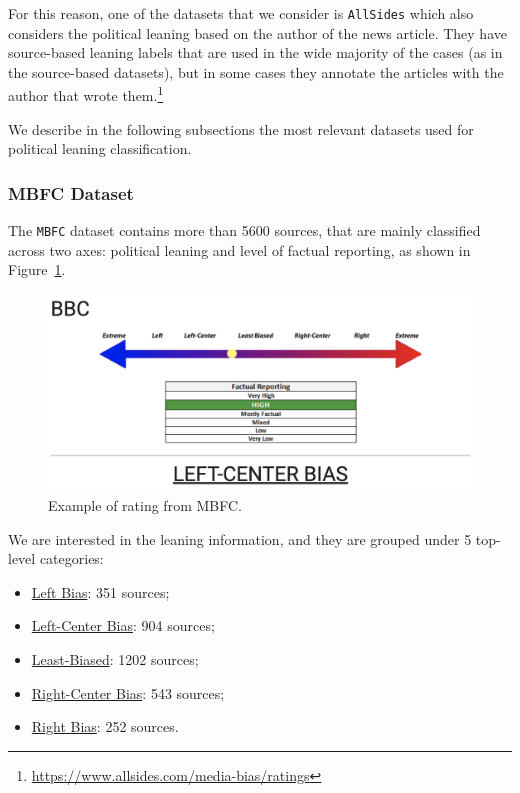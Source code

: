 For this reason, one of the datasets that we consider is \texttt{AllSides} which also considers the political leaning based on the author of the news article. They have source-based leaning labels that are used in the wide majority of the cases (as in the source-based datasets), but in some cases they annotate the articles with the author that wrote them.\footnote{\url{https://www.allsides.com/media-bias/ratings}}




We describe in the following subsections the most relevant datasets used for political leaning classification.



\subsubsection{MBFC Dataset}

The \texttt{MBFC} dataset contains more than 5600 sources, that are mainly classified across two axes: political leaning and level of factual reporting, as shown in Figure~\ref{fig:mbfc_bbc}.

\begin{figure}[!htbp]
    \centering
    \includegraphics[width=\linewidth]{figures/mbfc_bbc.png}
    \caption{Example of rating from MBFC.}
    \label{fig:mbfc_bbc}
\end{figure}

We are interested in the leaning information, and they are grouped under 5 top-level categories:

\begin{itemize}
    \item \href{https://mediabiasfactcheck.com/left/}{Left Bias}: 351 sources;
    \item \href{https://mediabiasfactcheck.com/leftcenter/}{Left-Center Bias}: 904 sources;
    \item \href{https://mediabiasfactcheck.com/center/}{Least-Biased}: 1202 sources;
    \item \href{https://mediabiasfactcheck.com/right-center/}{Right-Center Bias}: 543 sources;
    \item \href{https://mediabiasfactcheck.com/right/}{Right Bias}: 252 sources.
\end{itemize}

